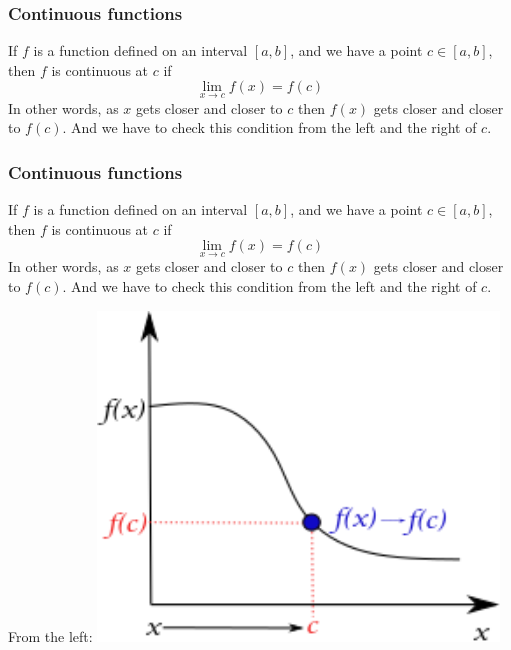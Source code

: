 \documentclass{if-beamer}
\begin{document}
\begin{frame}
\frametitle{Continuous functions}
If $f$ is a function defined on an interval $[a,b]$, and we have a
point $c \in [a,b]$, then $f$ is continuous at $c$ if
\begin{equation*}
\lim_{x \rightarrow c} f(x) = f(c)
\end{equation*}
In other words, as $x$ gets closer and closer to $c$ then $f(x)$ gets closer and closer to $f(c)$. And we have to check this condition from the left and the right of $c$.
\end{frame}

\begin{frame}
\frametitle{Continuous functions}
If $f$ is a function defined on an interval $[a,b]$, and we have a
point $c \in [a,b]$, then $f$ is continuous at $c$ if
\begin{equation}
\lim_{x \rightarrow c} f(x) = f(c)
\end{equation}
In other words, as $x$ gets closer and closer to $c$ then $f(x)$ gets closer and closer to $f(c)$. And we have to check this condition from the left and the right of $c$. \\
\vspace{10pt}
\begin{minipage}{0.5\textwidth}
	From the left:
	\centering
	\includegraphics[width = 0.8\textwidth]{figures/left}
\end{minipage}
\end{frame}
\end{document}
